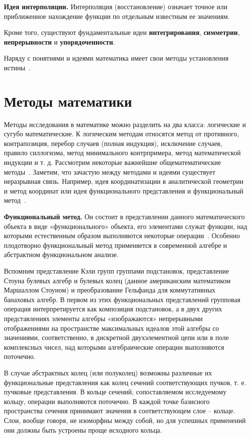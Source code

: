 \textbf{Идея интерполяции.} Интерполяция (восстановление) означает точное или приближенное нахождение функции по отдельным известным ее значениям.

Кроме того, существуют фундаментальные идеи \textbf{интегрирования}, \textbf{симметрии}, \textbf{непрерывности} и \textbf{упорядоченности}.

Наряду с понятиями и идеями математика имеет свои методы установления истины~\cite{вечтомов2013философия}.

\section{Методы математики}

Методы исследования в математике можно разделить на два класса: логические и сугубо математические. К логическим методам относятся метод от противного, контрапозиция, перебор случаев (полная индукция), исключение случаев, правило силлогизма, метод минимального контрпримера, метод математической индукции и т. д. Рассмотрим некоторые важнейшие общематематические методы~\cite{александров1956общий}. Заметим, что зачастую между методами и идеями существует неразрывная связь. Например, идея координатизации в аналитической геометрии и метод координат или идея функционального представления и функциональный метод~\cite{вечтомов2013философия}.

\textbf{Функциональный метод.} Он состоит в представлении данного математического объекта в виде «функционального» объекта, его элементами служат функции, над которыми естественным образом выполняются некоторые операции~\cite{коллатц1969функциональный}. Особенно плодотворно функциональный метод применяется в современной алгебре и абстрактном функциональном анализе.

Вспомним представление Кэли групп группами подстановок, представление Стоуна булевых алгебр и булевых колец (данное американским математиком Маршаллом Стоуном) и преобразование Гельфанда для коммутативных банаховых алгебр. В первом из этих функциональных представлений групповая операция интерпретируется как композиция подстановок, а в двух других представлениях элементы алгебры «изображаются» непрерывными отображениями на пространстве максимальных идеалов этой алгебры со значениями, соответственно, в дискретной двухэлементной цепи или в поле комплексных чисел, над которыми алгебраические операции выполняются поточечно.

В случае абстрактных колец (или полуколец) возможны различные их функциональные представления как колец сечений соответствующих пучков, т. е. пучковые представления. В кольце сечений, сопоставляемом исследуемому кольцу, операции выполняются поточечно. В каждой точке базисного пространства сечения принимают значения в соответствующем слое – кольце. Слои, вообще говоря, не изоморфны между собой, но для успешных применений они должны быть устроены проще исходного кольца.

